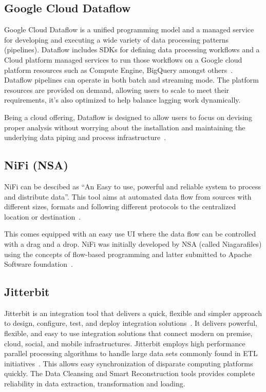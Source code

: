     \pv

\subsection{Google Cloud Dataflow \vc}
    
Google Cloud Dataflow is a unified programming model and a managed
service for developing and executing a wide variety of data processing
patterns (pipelines). Dataflow includes SDKs for defining data
processing workflows and a Cloud platform managed services to run
those workflows on a Google cloud platform resources such as Compute
Engine, BigQuery amongst others~\cite{www-Dataflow}. Dataflow
pipelines can operate in both batch and streaming mode. The platform
resources are provided on demand, allowing users to scale to meet
their requirements, it’s also optimized to help balance lagging work
dynamically.

Being a cloud offering, Dataflow is designed to allow users to focus
on devising proper analysis without worrying about the installation
and maintaining the underlying data piping and process
infrastructure~\cite{www-GoogleLiveStream}.

    \pv
    
\subsection{NiFi (NSA)}

NiFi can be descibed as ``An Easy to use, powerful and reliable system
to process and distribute data''\cite{www-nifi}.  This tool aims at
automated data flow from sources with different sizes, formats and
following different protocols to the centralized location or
destination~\cite{www-hortanworks}.
    
This comes equipped with an easy use UI where the data flow can be
controlled with a drag and a drop.  NiFi was initially developed by
NSA (called Niagarafiles) using the concepts of flow-based programming
and latter submitted to Apache Software foundation~\cite{www-forbes}.


    \pv

\subsection{Jitterbit}

Jitterbit is an integration tool that delivers a quick, flexible and
simpler approach to design, configure, test, and deploy integration
solutions~\cite{datasheet}.  It delivers powerful, flexible, and easy
to use integration solutions that connect modern on premise, cloud,
social, and mobile infrastructures. Jitterbit employs high performance
parallel processing algorithms to handle large data sets commonly
found in ETL initiatives~\cite{www-jitetl}. This allows easy
synchronization of disparate computing platforms quickly. The Data
Cleansing and Smart Reconstruction tools provides complete reliability
in data extraction, transformation and loading.

